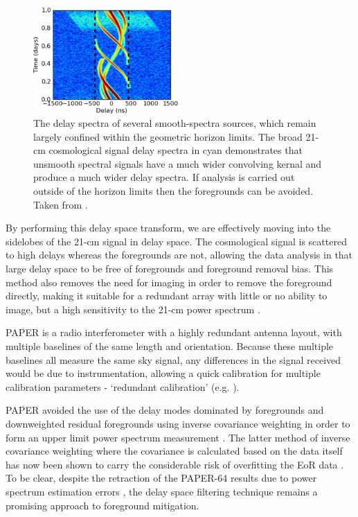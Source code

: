 \begin{figure}
\begin{center}
    \includegraphics[width=0.5\textwidth]{Images/horizon.jpg}
\end{center}
    \caption{The delay spectra of several smooth-spectra sources, which remain largely confined within the geometric horizon limits. The broad 21-cm cosmological signal delay spectra in cyan demonstrates that unsmooth spectral signals have a much wider convolving kernal and produce a much wider delay spectra. If analysis is carried out outside of the horizon limits then the foregrounds can be avoided. Taken from \citet{Parsons2012ApJ...756..165P}.}
    \label{fig:horizon}
\end{figure}

By performing this delay space transform, we are effectively moving into the sidelobes of the 21-cm signal in delay space. The cosmological signal is scattered to high delays whereas the foregrounds are not, allowing the data analysis in that large delay space to be free of foregrounds and foreground removal bias. This method also removes the need for imaging in order to remove the foreground directly, making it suitable for a redundant array with little or no ability to image, but a high sensitivity to the 21-cm power spectrum \citep{Parsons2012ApJ...753...81P}.   

PAPER is a radio interferometer with a highly redundant antenna layout, with multiple baselines of the same length and orientation. Because these multiple baselines all measure the same sky signal, any differences in the signal received would be due to instrumentation, allowing a quick calibration for multiple calibration parameters - `redundant calibration' (e.g. \citet{Ronniy2018AJ....156..285J,Li2018ApJ...863..170L,Dillon2016ApJ...826..181D,Zheng2014MNRAS.445.1084Z,Wieringa1992ExA.....2..203W}). 

PAPER avoided the use of the delay modes dominated by foregrounds and downweighted residual foregrounds using inverse covariance weighting in order to form an upper limit power spectrum measurement \citep{Ali2015ApJ...809...61A}. The latter method of inverse covariance weighting where the covariance is calculated based on the data itself has now been shown to carry the considerable risk of overfitting the EoR data \citep{Cheng2018ApJ...868...26C}. To be clear, despite the retraction of the PAPER-64 results due to power spectrum estimation errors \citep{Ali2018ApJ...863..201A}, the delay space filtering technique remains a promising approach to foreground mitigation.

